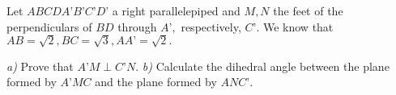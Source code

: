 Let $ ABCDA’B’C’D’ $ a right parallelepiped and $ M,N $ the feet of the perpendiculars of $ BD $ through $ A’, $ respectively, $ C’. $ We know that $ AB=\sqrt 2, BC=\sqrt 3, AA’=\sqrt 2. $

\textit{a)} Prove that $ A’M\perp C’N. $
\textit{b)} Calculate the dihedral angle between the plane formed by $ A’MC $ and the plane formed by $ ANC’. $